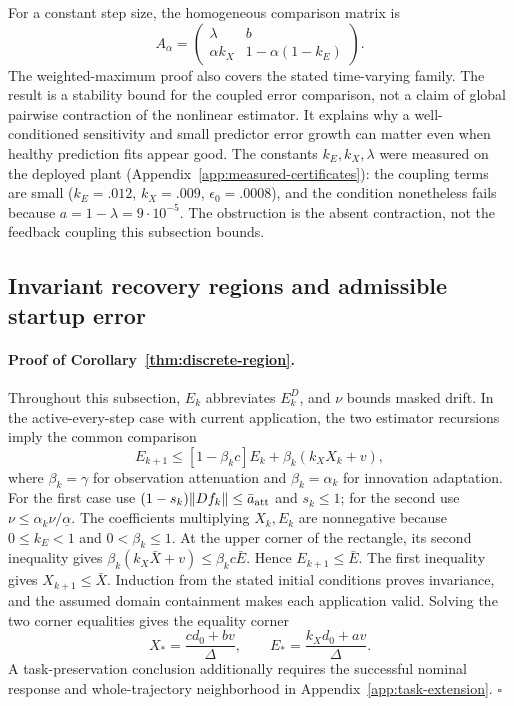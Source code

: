 For a constant step size, the homogeneous comparison matrix is
\[
 A_\alpha=\begin{pmatrix}\lambda&b\\
             \alpha k_X&1-\alpha(1-k_E)\end{pmatrix}.
\]
The weighted-maximum proof also covers the stated time-varying family.
The result is a stability bound for the coupled error comparison, not a claim
of global pairwise contraction of the nonlinear estimator. It explains why a
well-conditioned sensitivity and small predictor error growth can matter even
when healthy prediction fits appear good. The constants $k_E,k_X,\lambda$ were measured on the deployed plant
(Appendix~\ref{app:measured-certificates}): the coupling terms are small
($k_E=.012$, $k_X=.009$, $\epsilon_0=.0008$), and the condition nonetheless
fails because $a=1-\lambda=9\cdot10^{-5}$. The obstruction is the absent
contraction, not the feedback coupling this subsection bounds.

\subsection{Invariant recovery regions and admissible startup error}
\label{app:discrete-region}
\paragraph{Proof of Corollary~\ref{thm:discrete-region}.}
Throughout this subsection, $E_k$ abbreviates $E_k^D$, and $\nu$ bounds
masked drift.
In the active-every-step case with current application, the two estimator
recursions imply the common comparison
\[
E_{k+1}\le[1-\beta_k c]E_k+\beta_k(k_XX_k+v),
\]
where $\beta_k=\gamma$ for observation attenuation and $\beta_k=\alpha_k$
for innovation adaptation. For the first case use
$(1-s_k)\|Df_k\|\le\bar a_{\rm att}$ and $s_k\le1$; for the second
use $\nu\le\alpha_k\nu/\underline\alpha$.
The coefficients multiplying $X_k,E_k$ are nonnegative because
$0\le k_E<1$ and $0<\beta_k\le1$. At the upper corner of the
rectangle, its second inequality gives
$\beta_k(k_X\bar X+v)\le\beta_k c\bar E$. Hence
$E_{k+1}\le\bar E$.
The first inequality gives $X_{k+1}\le\bar X$. Induction from the stated
initial conditions proves invariance, and the assumed domain containment
makes each application valid. Solving the two corner equalities gives
the equality corner
\begin{equation}
X_* =\frac{cd_0+bv}{\Delta},\qquad
E_* =\frac{k_Xd_0+av}{\Delta}.
\label{eq:discrete-corner}
\end{equation}
A task-preservation conclusion additionally
requires the successful nominal response and whole-trajectory neighborhood
in Appendix~\ref{app:task-extension}. \hfill$\square$

